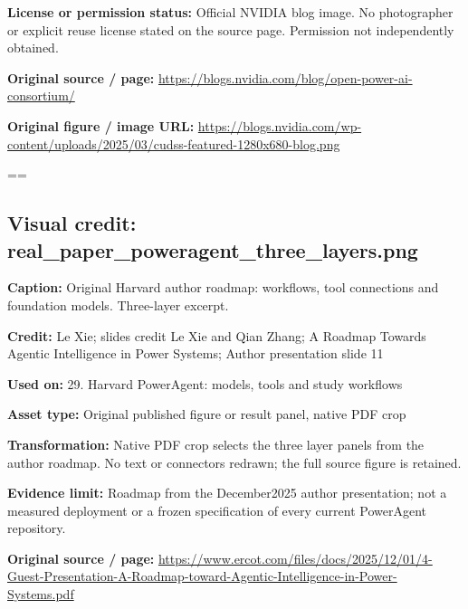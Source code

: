 \documentclass[10pt,letterpaper]{article}
\begin{document}
\textbf{License or permission status:} Official NVIDIA blog image. No photographer or explicit reuse license stated on the source page. Permission not independently obtained.\par
\textbf{Original source / page:} \href{https://blogs.nvidia.com/blog/open-power-ai-consortium/}{\small\ttfamily https:/\allowbreak{}/\allowbreak{}blogs.\allowbreak{}nvidia.\allowbreak{}com/\allowbreak{}blog/\allowbreak{}open-\allowbreak{}power-\allowbreak{}ai-\allowbreak{}consortium/\allowbreak{}}\par
\textbf{Original figure / image URL:} \href{https://blogs.nvidia.com/wp-content/uploads/2025/03/cudss-featured-1280x680-blog.png}{\small\ttfamily https:/\allowbreak{}/\allowbreak{}blogs.\allowbreak{}nvidia.\allowbreak{}com/\allowbreak{}wp-\allowbreak{}content/\allowbreak{}uploads/\allowbreak{}2025/\allowbreak{}03/\allowbreak{}cudss-\allowbreak{}featured-\allowbreak{}1280x680-\allowbreak{}blog.\allowbreak{}png}\par
\egroup\par\noindent\box\readingEntry\par\medskip
\setbox\readingEntry=\vbox\bgroup\hsize=\linewidth\subsection*{Visual credit: real\_paper\_poweragent\_three\_layers.png}
\textbf{Caption:} Original Harvard author roadmap: workflows, tool connections and foundation models. Three-layer excerpt.\par
\textbf{Credit:} Le Xie; slides credit Le Xie and Qian Zhang; A Roadmap Towards Agentic Intelligence in Power Systems; Author presentation slide 11\par
\textbf{Used on:} 29. Harvard PowerAgent: models, tools and study workflows\par
\textbf{Asset type:} Original published figure or result panel, native PDF crop\par
\textbf{Transformation:} Native PDF crop selects the three layer panels from the author roadmap. No text or connectors redrawn; the full source figure is retained.\par
\textbf{Evidence limit:} Roadmap from the December2025 author presentation; not a measured deployment or a frozen specification of every current PowerAgent repository.\par
\textbf{Original source / page:} \href{https://www.ercot.com/files/docs/2025/12/01/4-Guest-Presentation-A-Roadmap-toward-Agentic-Intelligence-in-Power-Systems.pdf}{\small\ttfamily https:/\allowbreak{}/\allowbreak{}www.\allowbreak{}ercot.\allowbreak{}com/\allowbreak{}files/\allowbreak{}docs/\allowbreak{}2025/\allowbreak{}12/\allowbreak{}01/\allowbreak{}4-\allowbreak{}Guest-\allowbreak{}Presentation-\allowbreak{}A-\allowbreak{}Roadmap-\allowbreak{}toward-\allowbreak{}Agentic-\allowbreak{}Intelligence-\allowbreak{}in-\allowbreak{}Power-\allowbreak{}Systems.\allowbreak{}pdf}\par
\end{document}
